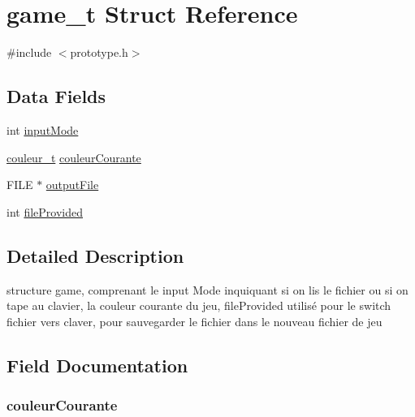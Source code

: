 \hypertarget{structgame__t}{}\section{game\+\_\+t Struct Reference}
\label{structgame__t}


{\ttfamily \#include $<$prototype.\+h$>$}

\subsection*{Data Fields}
\begin{DoxyCompactItemize}
\item 
int \hyperlink{structgame__t_a1518cba187fa72a6e7a6d14c851bcfa3}{input\+Mode}
\item 
\hyperlink{prototype_8h_a2fc0928aba15295ee980b903ed92f23f}{couleur\+\_\+t} \hyperlink{structgame__t_a01f1dcd0783145237d55e59594c74c8b}{couleur\+Courante}
\item 
F\+I\+LE $\ast$ \hyperlink{structgame__t_af90684c72474cb2cd16f4458941e6988}{output\+File}
\item 
int \hyperlink{structgame__t_a99494c1e05fbe120bb600a81281066a3}{file\+Provided}
\end{DoxyCompactItemize}


\subsection{Detailed Description}
structure game, comprenant le input Mode inquiquant si on lis le fichier ou si on tape au clavier, la couleur courante du jeu, file\+Provided utilisé pour le switch fichier vers claver, pour sauvegarder le fichier dans le nouveau fichier de jeu 

\subsection{Field Documentation}
\subsubsection[{\texorpdfstring{couleur\+Courante}{couleurCourante}}]{ couleur\+Courante}\hypertarget{structgame__t_a01f1dcd0783145237d55e59594c74c8b}{}\label{structgame__t_a01f1dcd0783145237d55e59594c74c8b}
